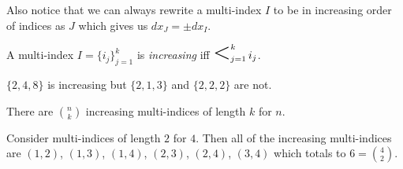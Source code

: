 \documentclass[notes]{subfiles}
\begin{document}
Also notice that we can always rewrite a multi-index $I$ to be in increasing order of indices as $J$ which gives us $dx_J = \pm dx_I$.

\begin{definition}
    A multi-index $I = \{ i_j \}_{j = 1}^k$ is \textit{increasing} iff $\bigless_{j = 1}^{k} i_j$.
\end{definition}

\begin{example}
    $\{ 2, 4, 8 \}$ is increasing but $\{ 2, 1, 3 \}$ and $\{ 2, 2, 2 \}$ are not.
\end{example}

\begin{lemma}
    There are $\binom{n}{k}$ increasing multi-indices of length $k$ for $n$.
\end{lemma}

\begin{example}
    Consider multi-indices of length $2$ for $4$. Then all of the increasing multi-indices are $(1, 2)$, $(1, 3)$, $(1, 4)$, $(2, 3)$, $(2, 4)$, $(3, 4)$ which totals to $6 = \binom{4}{2}$.
\end{example}
\end{document}

